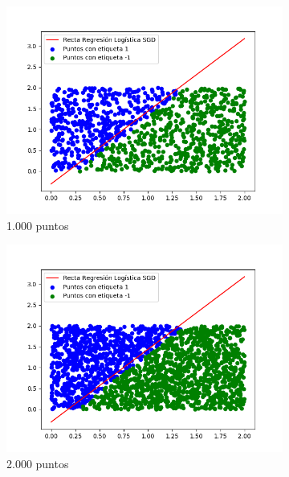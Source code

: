 \documentclass[12pt,a4paper]{article}
\begin{document}
\begin{figure}[H]
	\centering
	\begin{subfigure}{0.32\textwidth}
		\includegraphics[scale=0.37]{./Imagenes/ej2-25.png}
		\caption{1.000 puntos}
	\end{subfigure}
	\begin{subfigure}{0.33\textwidth}
		\includegraphics[scale=0.37]{./Imagenes/ej2-26.png}
		\caption{2.000 puntos}
	\end{subfigure}
	\begin{subfigure}{0.33\textwidth}

\end{subfigure}
\end{figure}
\end{document}

